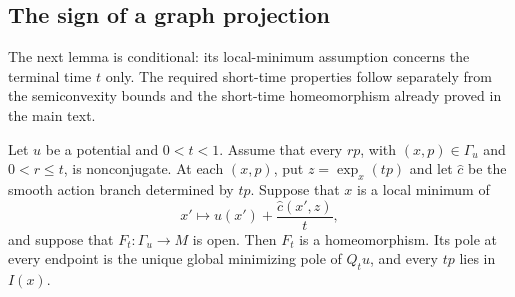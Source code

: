 \subsection{The sign of a graph projection}

The next lemma is conditional: its local-minimum assumption concerns
the terminal time $t$ only.  The required short-time properties follow
separately from the semiconvexity bounds and the short-time
homeomorphism already proved in the main text.

\begin{lemma}
\label{geo:degree}
Let $u$ be a potential and $0<t<1$.  Assume that every $rp$, with
$(x,p)\in\Gamma_u$ and $0<r\leq t$, is nonconjugate.  At each
$(x,p)$, put $z=\exp_x(tp)$ and let $\hat c$ be the smooth action
branch determined by $tp$.  Suppose that $x$ is a local minimum of
\[
 x'\longmapsto u(x')+\frac{\hat c(x',z)}t,
\]
and suppose that $F_t:\Gamma_u\to M$ is open.
Then $F_t$ is a homeomorphism.  Its pole at every endpoint is the
unique global minimizing pole of $Q_tu$, and every $tp$ lies in $I(x)$.
\end{lemma}

